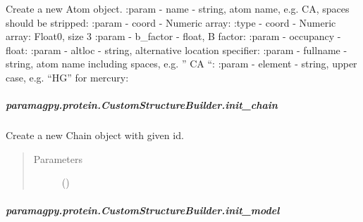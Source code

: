 \documentclass[a4paper,10pt,english,openany,oneside]{sphinxmanual}
\begin{document}
\begin{fulllineitems}
\begin{fulllineitems}
\begin{fulllineitems}
\label{\detokenize{reference/generated/paramagpy.protein.CustomStructureBuilder.init_atom:paramagpy.protein.CustomStructureBuilder.init_atom}}
Create a new Atom object.
:param - name - string, atom name, e.g. CA, spaces should be stripped:
:param - coord - Numeric array:
:type - coord - Numeric array: Float0, size 3
:param - b\_factor - float, B factor:
:param - occupancy - float:
:param - altloc - string, alternative location specifier:
:param - fullname - string, atom name including spaces, e.g. ” CA “:
:param - element - string, upper case, e.g. “HG” for mercury:

\end{fulllineitems}



\subparagraph{paramagpy.protein.CustomStructureBuilder.init\_chain}
\label{\detokenize{reference/generated/paramagpy.protein.CustomStructureBuilder.init_chain:paramagpy-protein-customstructurebuilder-init-chain}}\label{\detokenize{reference/generated/paramagpy.protein.CustomStructureBuilder.init_chain::doc}}

\begin{fulllineitems}
\label{\detokenize{reference/generated/paramagpy.protein.CustomStructureBuilder.init_chain:paramagpy.protein.CustomStructureBuilder.init_chain}}
Create a new Chain object with given id.
\begin{quote}\begin{description}
\item[{Parameters}] \leavevmode
{} (\sphinxstyleliteralemphasis{\sphinxupquote{-}}) \textendash{} 

\end{description}\end{quote}

\end{fulllineitems}



\subparagraph{paramagpy.protein.CustomStructureBuilder.init\_model}
\label{\detokenize{reference/generated/paramagpy.protein.CustomStructureBuilder.init_model:paramagpy-protein-customstructurebuilder-init-model}}\label{\detokenize{reference/generated/paramagpy.protein.CustomStructureBuilder.init_model::doc}}


\end{fulllineitems}
\end{fulllineitems}
\end{document}
